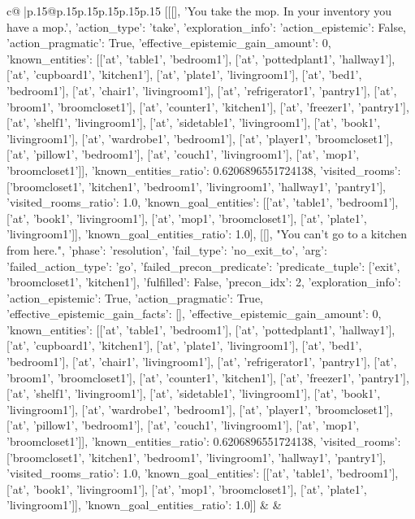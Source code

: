\documentclass{article}
\begin{document}
{\begin{supertabular}{c@{$\;$}|p{.15\linewidth}@{}p{.15\linewidth}p{.15\linewidth}p{.15\linewidth}p{.15\linewidth}p{.15\linewidth}}
{{{	 [[[], 'You take the mop. In your inventory you have a mop.', {'action_type': 'take', 'exploration_info': {'action_epistemic': False, 'action_pragmatic': True, 'effective_epistemic_gain_amount': 0, 'known_entities': [['at', 'table1', 'bedroom1'], ['at', 'pottedplant1', 'hallway1'], ['at', 'cupboard1', 'kitchen1'], ['at', 'plate1', 'livingroom1'], ['at', 'bed1', 'bedroom1'], ['at', 'chair1', 'livingroom1'], ['at', 'refrigerator1', 'pantry1'], ['at', 'broom1', 'broomcloset1'], ['at', 'counter1', 'kitchen1'], ['at', 'freezer1', 'pantry1'], ['at', 'shelf1', 'livingroom1'], ['at', 'sidetable1', 'livingroom1'], ['at', 'book1', 'livingroom1'], ['at', 'wardrobe1', 'bedroom1'], ['at', 'player1', 'broomcloset1'], ['at', 'pillow1', 'bedroom1'], ['at', 'couch1', 'livingroom1'], ['at', 'mop1', 'broomcloset1']], 'known_entities_ratio': 0.6206896551724138, 'visited_rooms': ['broomcloset1', 'kitchen1', 'bedroom1', 'livingroom1', 'hallway1', 'pantry1'], 'visited_rooms_ratio': 1.0, 'known_goal_entities': [['at', 'table1', 'bedroom1'], ['at', 'book1', 'livingroom1'], ['at', 'mop1', 'broomcloset1'], ['at', 'plate1', 'livingroom1']], 'known_goal_entities_ratio': 1.0}}], [[], "You can't go to a kitchen from here.", {'phase': 'resolution', 'fail_type': 'no_exit_to', 'arg': {'failed_action_type': 'go', 'failed_precon_predicate': {'predicate_tuple': ['exit', 'broomcloset1', 'kitchen1'], 'fulfilled': False, 'precon_idx': 2}}, 'exploration_info': {'action_epistemic': True, 'action_pragmatic': True, 'effective_epistemic_gain_facts': [], 'effective_epistemic_gain_amount': 0, 'known_entities': [['at', 'table1', 'bedroom1'], ['at', 'pottedplant1', 'hallway1'], ['at', 'cupboard1', 'kitchen1'], ['at', 'plate1', 'livingroom1'], ['at', 'bed1', 'bedroom1'], ['at', 'chair1', 'livingroom1'], ['at', 'refrigerator1', 'pantry1'], ['at', 'broom1', 'broomcloset1'], ['at', 'counter1', 'kitchen1'], ['at', 'freezer1', 'pantry1'], ['at', 'shelf1', 'livingroom1'], ['at', 'sidetable1', 'livingroom1'], ['at', 'book1', 'livingroom1'], ['at', 'wardrobe1', 'bedroom1'], ['at', 'player1', 'broomcloset1'], ['at', 'pillow1', 'bedroom1'], ['at', 'couch1', 'livingroom1'], ['at', 'mop1', 'broomcloset1']], 'known_entities_ratio': 0.6206896551724138, 'visited_rooms': ['broomcloset1', 'kitchen1', 'bedroom1', 'livingroom1', 'hallway1', 'pantry1'], 'visited_rooms_ratio': 1.0, 'known_goal_entities': [['at', 'table1', 'bedroom1'], ['at', 'book1', 'livingroom1'], ['at', 'mop1', 'broomcloset1'], ['at', 'plate1', 'livingroom1']], 'known_goal_entities_ratio': 1.0}}]] 
	  } 
	   } 
	   } 
	 & & \\ 
 


\end{supertabular}}
\end{document}
